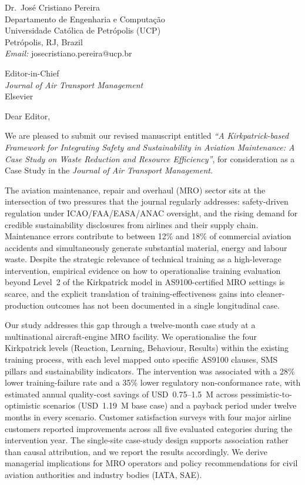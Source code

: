 \documentclass[11pt,a4paper]{article}
\begin{document}
\noindent
Dr.\ Jos\'e Cristiano Pereira \\
Departamento de Engenharia e Computa\c{c}\~ao \\
Universidade Cat\'olica de Petr\'opolis (UCP) \\
Petr\'opolis, RJ, Brazil \\
\textit{Email:} josecristiano.pereira@ucp.br

\bigskip

\noindent
[DATE]

\bigskip

\noindent
Editor-in-Chief \\
\textit{Journal of Air Transport Management} \\
Elsevier

\bigskip

\noindent Dear Editor,

We are pleased to submit our revised manuscript entitled
\textit{``A Kirkpatrick-based Framework for Integrating Safety and
Sustainability in Aviation Maintenance: A Case Study on Waste Reduction and
Resource Efficiency''}, for consideration as a Case Study in the
\textit{Journal of Air Transport Management}.

The aviation maintenance, repair and overhaul (MRO) sector sits at the
intersection of two pressures that the journal regularly addresses:
safety-driven regulation under ICAO/FAA/EASA/ANAC oversight, and the rising
demand for credible sustainability disclosures from airlines and their
supply chain. Maintenance errors contribute to between 12\% and 18\% of
commercial aviation accidents and simultaneously generate substantial
material, energy and labour waste. Despite the strategic relevance of
technical training as a high-leverage intervention, empirical evidence
on how to operationalise training evaluation beyond Level~2 of the
Kirkpatrick model in AS9100-certified MRO settings is scarce, and the
explicit translation of training-effectiveness gains into cleaner-production
outcomes has not been documented in a single longitudinal case.

Our study addresses this gap through a twelve-month case study at a
multinational aircraft-engine MRO facility. We operationalise the four
Kirkpatrick levels (Reaction, Learning, Behaviour, Results) within the
existing training process, with each level mapped onto specific AS9100
clauses, SMS pillars and sustainability indicators. The intervention
was associated with a 28\% lower training-failure rate and a 35\% lower
regulatory non-conformance rate, with estimated annual quality-cost
savings of USD~0.75--1.5~M across pessimistic-to-optimistic scenarios
(USD~1.19~M base case) and a payback period under twelve months in every
scenario. Customer satisfaction surveys with four major airline customers reported
improvements across all five evaluated categories during the intervention
year. The single-site
case-study design supports association rather than causal attribution,
and we report the results accordingly. We derive managerial implications
for MRO operators and policy recommendations for civil aviation
authorities and industry bodies (IATA, SAE).
\end{document}
